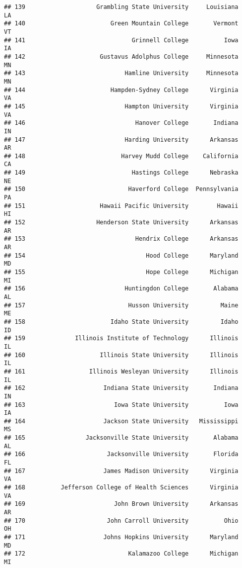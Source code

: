 \documentclass[
]{article}
\begin{document}
\begin{verbatim}
## 139                    Grambling State University     Louisiana         LA
## 140                        Green Mountain College       Vermont         VT
## 141                              Grinnell College          Iowa         IA
## 142                     Gustavus Adolphus College     Minnesota         MN
## 143                            Hamline University     Minnesota         MN
## 144                        Hampden-Sydney College      Virginia         VA
## 145                            Hampton University      Virginia         VA
## 146                               Hanover College       Indiana         IN
## 147                            Harding University      Arkansas         AR
## 148                           Harvey Mudd College    California         CA
## 149                              Hastings College      Nebraska         NE
## 150                             Haverford College  Pennsylvania         PA
## 151                     Hawaii Pacific University        Hawaii         HI
## 152                    Henderson State University      Arkansas         AR
## 153                               Hendrix College      Arkansas         AR
## 154                                  Hood College      Maryland         MD
## 155                                  Hope College      Michigan         MI
## 156                            Huntingdon College       Alabama         AL
## 157                             Husson University         Maine         ME
## 158                        Idaho State University         Idaho         ID
## 159              Illinois Institute of Technology      Illinois         IL
## 160                     Illinois State University      Illinois         IL
## 161                  Illinois Wesleyan University      Illinois         IL
## 162                      Indiana State University       Indiana         IN
## 163                         Iowa State University          Iowa         IA
## 164                      Jackson State University   Mississippi         MS
## 165                 Jacksonville State University       Alabama         AL
## 166                       Jacksonville University       Florida         FL
## 167                      James Madison University      Virginia         VA
## 168          Jefferson College of Health Sciences      Virginia         VA
## 169                         John Brown University      Arkansas         AR
## 170                       John Carroll University          Ohio         OH
## 171                      Johns Hopkins University      Maryland         MD
## 172                             Kalamazoo College      Michigan         MI

\end{verbatim}
\end{document}
